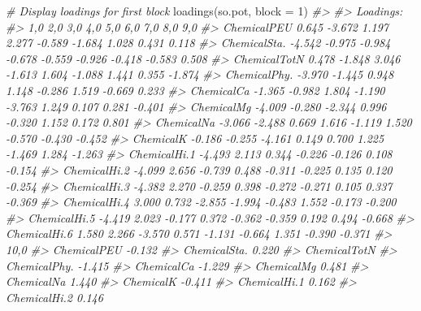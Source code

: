\documentclass[
]{article}
\newenvironment{Shaded}{\begin{snugshade}}{\end{snugshade}}
\newcommand{\AttributeTok}[1]{\textcolor[rgb]{0.77,0.63,0.00}{#1}}
\newcommand{\CommentTok}[1]{\textcolor[rgb]{0.56,0.35,0.01}{\textit{#1}}}
\newcommand{\DecValTok}[1]{\textcolor[rgb]{0.00,0.00,0.81}{#1}}
\newcommand{\FunctionTok}[1]{\textcolor[rgb]{0.00,0.00,0.00}{#1}}
\newcommand{\NormalTok}[1]{#1}
\begin{document}
\begin{Shaded}
\begin{Highlighting}[]
\CommentTok{\# Display loadings for first block}
\FunctionTok{loadings}\NormalTok{(so.pot, }\AttributeTok{block =} \DecValTok{1}\NormalTok{)}
\CommentTok{\#\textgreater{} }
\CommentTok{\#\textgreater{} Loadings:}
\CommentTok{\#\textgreater{}              1,0    2,0    3,0    4,0    5,0    6,0    7,0    8,0    9,0   }
\CommentTok{\#\textgreater{} ChemicalPEU   0.645 {-}3.672  1.197  2.277 {-}0.589 {-}1.684  1.028  0.431  0.118}
\CommentTok{\#\textgreater{} ChemicalSta. {-}4.542 {-}0.975 {-}0.984 {-}0.678 {-}0.559 {-}0.926 {-}0.418 {-}0.583  0.508}
\CommentTok{\#\textgreater{} ChemicalTotN  0.478 {-}1.848  3.046 {-}1.613  1.604 {-}1.088  1.441  0.355 {-}1.874}
\CommentTok{\#\textgreater{} ChemicalPhy. {-}3.970        {-}1.445  0.948  1.148 {-}0.286  1.519 {-}0.669  0.233}
\CommentTok{\#\textgreater{} ChemicalCa   {-}1.365 {-}0.982  1.804 {-}1.190 {-}3.763  1.249  0.107  0.281 {-}0.401}
\CommentTok{\#\textgreater{} ChemicalMg   {-}4.009 {-}0.280        {-}2.344  0.996 {-}0.320  1.152  0.172  0.801}
\CommentTok{\#\textgreater{} ChemicalNa   {-}3.066 {-}2.488  0.669  1.616 {-}1.119  1.520 {-}0.570 {-}0.430 {-}0.452}
\CommentTok{\#\textgreater{} ChemicalK    {-}0.186 {-}0.255 {-}4.161  0.149  0.700  1.225 {-}1.469  1.284 {-}1.263}
\CommentTok{\#\textgreater{} ChemicalHi.1 {-}4.493  2.113         0.344 {-}0.226        {-}0.126  0.108 {-}0.154}
\CommentTok{\#\textgreater{} ChemicalHi.2 {-}4.099  2.656 {-}0.739  0.488 {-}0.311 {-}0.225  0.135  0.120 {-}0.254}
\CommentTok{\#\textgreater{} ChemicalHi.3 {-}4.382  2.270 {-}0.259  0.398 {-}0.272 {-}0.271  0.105  0.337 {-}0.369}
\CommentTok{\#\textgreater{} ChemicalHi.4  3.000  0.732 {-}2.855        {-}1.994 {-}0.483  1.552 {-}0.173 {-}0.200}
\CommentTok{\#\textgreater{} ChemicalHi.5 {-}4.419  2.023 {-}0.177  0.372 {-}0.362 {-}0.359  0.192  0.494 {-}0.668}
\CommentTok{\#\textgreater{} ChemicalHi.6  1.580  2.266 {-}3.570  0.571 {-}1.131 {-}0.664  1.351 {-}0.390 {-}0.371}
\CommentTok{\#\textgreater{}              10,0  }
\CommentTok{\#\textgreater{} ChemicalPEU  {-}0.132}
\CommentTok{\#\textgreater{} ChemicalSta.  0.220}
\CommentTok{\#\textgreater{} ChemicalTotN       }
\CommentTok{\#\textgreater{} ChemicalPhy. {-}1.415}
\CommentTok{\#\textgreater{} ChemicalCa   {-}1.229}
\CommentTok{\#\textgreater{} ChemicalMg    0.481}
\CommentTok{\#\textgreater{} ChemicalNa    1.440}
\CommentTok{\#\textgreater{} ChemicalK    {-}0.411}
\CommentTok{\#\textgreater{} ChemicalHi.1  0.162}
\CommentTok{\#\textgreater{} ChemicalHi.2  0.146}

\end{Highlighting}
\end{Shaded}
\end{document}
